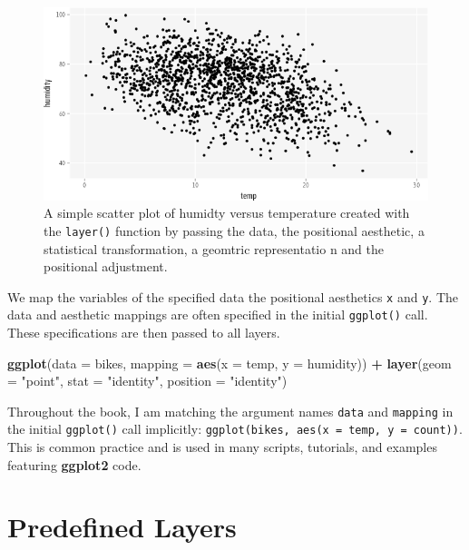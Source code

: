 \documentclass[
]{krantz}
\makeatletter
\newenvironment{Shaded}{\begin{snugshade}}{\end{snugshade}}
\newcommand{\AttributeTok}[1]{\textcolor[rgb]{0.27,0.27,0.27}{#1}}
\newcommand{\FunctionTok}[1]{\textcolor[rgb]{0.27,0.27,0.27}{\textbf{#1}}}
\newcommand{\NormalTok}[1]{#1}
\newcommand{\SpecialCharTok}[1]{\textcolor[rgb]{0.43,0.43,0.43}{\textbf{#1}}}
\newcommand{\StringTok}[1]{\textcolor[rgb]{0.5,0.5,0.5}{#1}}
\newenvironment{kframe}{%
\medskip{}
\setlength{\fboxsep}{.8em}
 \def\at@end@of@kframe{}%
 \ifinner\ifhmode%
  \def\at@end@of@kframe{\end{minipage}}%
  \begin{minipage}{\columnwidth}%
 \fi\fi%
 \def\FrameCommand##1{\hskip\@totalleftmargin \hskip-\fboxsep
 \colorbox{shadecolor}{##1}\hskip-\fboxsep
     \hskip-\linewidth \hskip-\@totalleftmargin \hskip\columnwidth}%
 \MakeFramed {\advance\hsize-\width
   \@totalleftmargin\z@ \linewidth\hsize
   \@setminipage}}%
 {\par\unskip\endMakeFramed%
 \at@end@of@kframe}
\renewenvironment{Shaded}{\begin{kframe}}{\end{kframe}}
\makeatother
\begin{document}
\begin{figure}
\centering
\includegraphics{bookdown_files/figure-latex/07layerScatter-1.png}
\caption{\label{fig:07layerScatter}A simple scatter plot of humidty versus temperature created with the \texttt{layer()} function by passing the data, the positional aesthetic, a statistical transformation, a geomtric representatio n and the positional adjustment.}
\end{figure}

We map the variables of the specified data the positional aesthetics \texttt{x} and \texttt{y}. The data and aesthetic mappings are often specified in the initial \texttt{ggplot()} call. These specifications are then passed to all layers.

\begin{Shaded}
\begin{Highlighting}[]
\FunctionTok{ggplot}\NormalTok{(}\AttributeTok{data =}\NormalTok{ bikes, }\AttributeTok{mapping =} \FunctionTok{aes}\NormalTok{(}\AttributeTok{x =}\NormalTok{ temp, }\AttributeTok{y =}\NormalTok{ humidity)) }\SpecialCharTok{+}
  \FunctionTok{layer}\NormalTok{(}\AttributeTok{geom =} \StringTok{"point"}\NormalTok{, }\AttributeTok{stat =} \StringTok{"identity"}\NormalTok{, }\AttributeTok{position =} \StringTok{"identity"}\NormalTok{)}
\end{Highlighting}
\end{Shaded}

Throughout the book, I am matching the argument names \texttt{data} and \texttt{mapping} in the initial \texttt{ggplot()} call implicitly: \texttt{ggplot(bikes,\ aes(x\ =\ temp,\ y\ =\ count))}. This is common practice and is used in many scripts, tutorials, and examples featuring \textbf{ggplot2} code.

\hypertarget{predefined-layers}{%
\section{Predefined Layers}\label{predefined-layers}}
\end{document}
